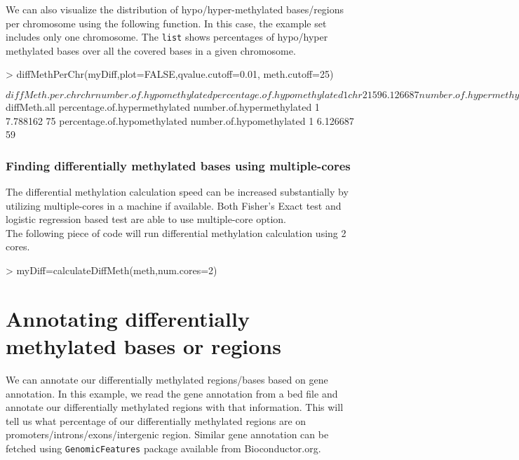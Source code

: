 \documentclass{article}
\begin{document}
We can also visualize the distribution of hypo/hyper-methylated bases/regions per chromosome using the following function. In this case, the example set includes only one chromosome. The \texttt{list} shows percentages of hypo/hyper methylated bases over all the covered bases in a given chromosome.

 
\begin{Schunk}
\begin{Sinput}
> diffMethPerChr(myDiff,plot=FALSE,qvalue.cutoff=0.01, meth.cutoff=25)
\end{Sinput}
\begin{Soutput}
$diffMeth.per.chr
    chr number.of.hypomethylated percentage.of.hypomethylated
1 chr21                       59                     6.126687
  number.of.hypermethylated percentage.of.hypermethylated
1                        75                      7.788162

$diffMeth.all
  percentage.of.hypermethylated number.of.hypermethylated
1                      7.788162                        75
  percentage.of.hypomethylated number.of.hypomethylated
1                     6.126687                       59
\end{Soutput}
\end{Schunk}
 
\subsubsection{Finding differentially methylated bases using multiple-cores}
The differential methylation calculation speed can be increased substantially by utilizing multiple-cores in a machine if available. Both Fisher's Exact test and logistic regression based test are able to use multiple-core option.
\\
The following piece of code will run differential methylation calculation using 2 cores.

\begin{Schunk}
\begin{Sinput}
> myDiff=calculateDiffMeth(meth,num.cores=2)
\end{Sinput}
\end{Schunk}


\section{Annotating differentially methylated bases or regions}
We can annotate our differentially methylated regions/bases based on gene annotation. In this example, we read the gene annotation from a bed file and annotate our differentially methylated regions with that information. This will tell us what percentage of our differentially methylated regions are on promoters/introns/exons/intergenic region. Similar gene annotation can be fetched using \texttt{GenomicFeatures} package available from Bioconductor.org.
\end{document}
